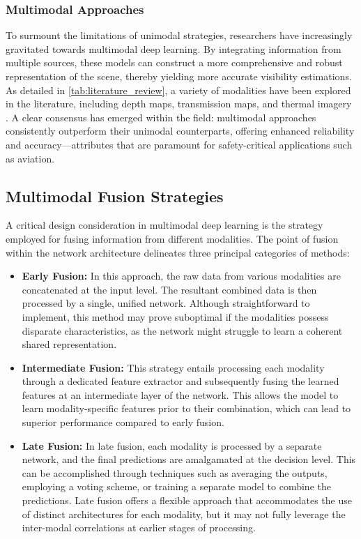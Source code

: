 \subsubsection{Multimodal Approaches}

To surmount the limitations of unimodal strategies, researchers have increasingly gravitated towards multimodal deep learning. By integrating information from multiple sources, these models can construct a more comprehensive and robust representation of the scene, thereby yielding more accurate visibility estimations. As detailed in \cref{tab:literature_review}, a variety of modalities have been explored in the literature, including depth maps, transmission maps, and thermal imagery \cite{You2022, Palvanov2019, Zhang2023, Chen2022, Wauben2016, Cheng2018, Zhou2021}. A clear consensus has emerged within the field: multimodal approaches consistently outperform their unimodal counterparts, offering enhanced reliability and accuracy—attributes that are paramount for safety-critical applications such as aviation.

\subsection{Multimodal Fusion Strategies}

A critical design consideration in multimodal deep learning is the strategy employed for fusing information from different modalities. The point of fusion within the network architecture delineates three principal categories of methods:

\begin{itemize}
    \item \textbf{Early Fusion:} In this approach, the raw data from various modalities are concatenated at the input level. The resultant combined data is then processed by a single, unified network. Although straightforward to implement, this method may prove suboptimal if the modalities possess disparate characteristics, as the network might struggle to learn a coherent shared representation.

    \item \textbf{Intermediate Fusion:} This strategy entails processing each modality through a dedicated feature extractor and subsequently fusing the learned features at an intermediate layer of the network. This allows the model to learn modality-specific features prior to their combination, which can lead to superior performance compared to early fusion.

    \item \textbf{Late Fusion:} In late fusion, each modality is processed by a separate network, and the final predictions are amalgamated at the decision level. This can be accomplished through techniques such as averaging the outputs, employing a voting scheme, or training a separate model to combine the predictions. Late fusion offers a flexible approach that accommodates the use of distinct architectures for each modality, but it may not fully leverage the inter-modal correlations at earlier stages of processing.
\end{itemize}

